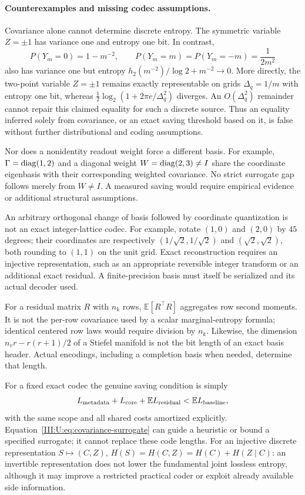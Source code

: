 \paragraph{Counterexamples and missing codec assumptions.}
Covariance alone cannot determine discrete entropy. The symmetric
variable $Z=\pm1$ has variance one and entropy one bit. In contrast,
\[
 P(Y_m=0)=1-m^{-2},\qquad
 P(Y_m=m)=P(Y_m=-m)=\frac1{2m^2}
\]
also has variance one but entropy
$h_2(m^{-2})/\log2+m^{-2}\to0$.
More directly, the two-point variable $Z=\pm1$ remains exactly
representable on grids $\Delta_q=1/m$ with entropy one bit, whereas
$\tfrac12\log_2(1+2\pi e/\Delta_q^2)$ diverges. An
$O(\Delta_q^2)$ remainder cannot repair this claimed equality for
such a discrete source.
Thus an equality inferred solely from covariance, or an exact saving
threshold based on it, is false without further distributional and coding assumptions.

Nor does a nonidentity readout weight force a different basis. For
example, $\Gamma=\operatorname{diag}(1,2)$ and a diagonal weight
$W=\operatorname{diag}(2,3)\ne I$ share the coordinate eigenbasis with their
corresponding weighted covariance. No strict surrogate gap follows
merely from $W\ne I$. A measured saving would require empirical evidence
or additional structural assumptions.

An arbitrary orthogonal change of basis followed by coordinate
quantization is not an exact integer-lattice codec. For example, rotate
$(1,0)$ and $(2,0)$ by $45$ degrees; their coordinates are respectively
$(1/\sqrt2,1/\sqrt2)$ and $(\sqrt2,\sqrt2)$, both rounding to
$(1,1)$ on the unit grid. Exact reconstruction requires an injective
representation, such as an appropriate reversible integer transform
or an additional exact residual. A finite-precision basis must itself
be serialized and its actual decoder used.

For a residual matrix $R$ with $n_k$ rows,
$\mathbb E[R^\top R]$ aggregates row second moments. It is not the
per-row covariance used by a scalar marginal-entropy formula; identical
centered row laws would require division by $n_k$. Likewise, the
dimension $n_vr-r(r+1)/2$ of a Stiefel manifold is not the bit length
of an exact basis header. Actual encodings, including a completion
basis when needed, determine that length.

For a fixed exact codec the genuine saving condition is simply
\[
 L_{\rm metadata}+L_{\rm core}+\mathbb E L_{\rm residual}
                         <\mathbb E L_{\rm baseline},
\]
with the same scope and all shared costs amortized explicitly.
Equation~\eqref{III:U:eq:covariance-surrogate} can guide a heuristic or bound
a specified surrogate; it cannot replace these code lengths. For an
injective discrete representation $S\mapsto(C,Z)$,
$H(S)=H(C,Z)=H(C)+H(Z\mid C)$: an invertible representation does
not lower the fundamental joint lossless entropy, although it may
improve a restricted practical coder or exploit already available side
information.


